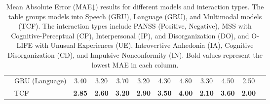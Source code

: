 \documentclass[9pt,a4paper]{rho-class/rho}
\begin{document}
\begin{table*}[htbp]
\begin{tabularx}{\textwidth}{>{\raggedright\arraybackslash}X | l | c | c | c | c | c | c | c | c | c | c }
                  & GRU (Language)   & 3.40 & 3.20 & 3.70 & 3.20 & 4.30 & 4.80 & 3.30 & 4.50 & 2.50 \\
                  & TCF       & \textbf{2.85} & \textbf{2.60} & \textbf{3.20} & \textbf{2.90} & \textbf{3.50} & \textbf{4.00} & \textbf{2.10} & \textbf{3.60} & \textbf{2.00} \\
\bottomrule
\end{tabularx}
\caption{Mean Absolute Error (MAE↓) results for different models and interaction types. The table groups models into Speech (GRU), Language (GRU), and Multimodal models (TCF). The interaction types include PANSS (Positive, Negative), MSS with Cognitive-Perceptual (CP), Interpersonal (IP), and Disorganization (DO), and O-LIFE with Unusual Experiences (UE), Introvertive Anhedonia (IA), Cognitive Disorganization (CD), and Impulsive Nonconformity (IN). Bold values represent the lowest MAE in each column.}
\end{table*}
\end{document}
